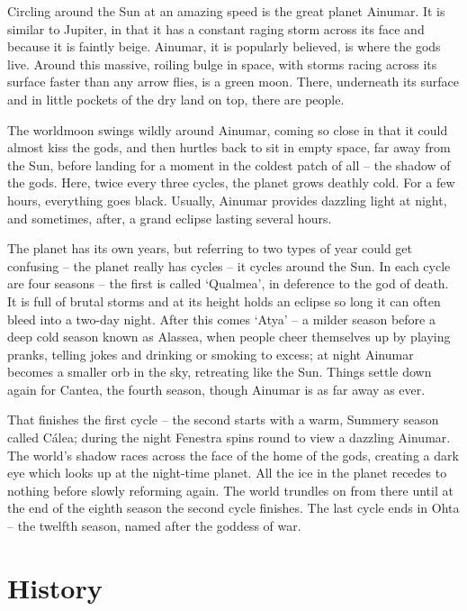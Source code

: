 \begin{multicols}{2}
\begin{tcolorbox}
\end{tcolorbox}

\noindent Circling around the Sun at an amazing speed is the great planet Ainumar.
It is similar to Jupiter, in that it has a constant raging storm across its face and because it is faintly beige.
Ainumar, it is popularly believed, is where the gods live.
Around this massive, roiling bulge in space, with storms racing across its surface faster than any arrow flies, is a green moon.
There, underneath its surface and in little pockets of the dry land on top, there are people.

The worldmoon swings wildly around Ainumar, coming so close in that it could almost kiss the gods, and then hurtles back to sit in empty space, far away from the Sun, before landing for a moment in the coldest patch of all -- the shadow of the gods.
Here, twice every three cycles, the planet grows deathly cold.
For a few hours, everything goes black.
Usually, Ainumar provides dazzling light at night, and sometimes, after, a grand eclipse lasting several hours.

The planet has its own years, but referring to two types of year could get confusing -- the planet really has cycles -- it cycles around the Sun.
In each cycle are four seasons -- the first is called `Qualmea', in deference to the god of death.
It is full of brutal storms and at its height holds an eclipse so long it can often bleed into a two-day night.
After this comes `Atya' -- a milder season before a deep cold season known as Alassea, when people cheer themselves up by playing pranks, telling jokes and drinking or smoking to excess; at night Ainumar becomes a smaller orb in the sky, retreating like the Sun.
Things settle down again for Cantea, the fourth season, though Ainumar is as far away as ever.

That finishes the first cycle -- the second starts with a warm, Summery season called C\'{a}lea; during the night Fenestra spins round to view a dazzling Ainumar.
The world's shadow races across the face of the home of the gods, creating a dark eye which looks up at the night-time planet.
All the ice in the planet recedes to nothing before slowly reforming again.
The world trundles on from there until at the end of the eighth season the second cycle finishes.
 The last cycle ends in Ohta -- the twelfth season, named after the goddess of war.

\end{multicols}

\chapter{History}

